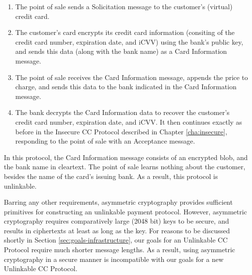 \begin{enumerate}
    \item The point of sale sends a Solicitation message to the customer's (virtual) credit card.
    \item The customer's card encrypts its credit card information (consiting of the credit card number, expiration date, and iCVV) using the bank's public key,
        and sends this data (along with the bank name) as a Card Information message.
    \item The point of sale receives the Card Information message, appends the price to charge, and sends this data to the bank indicated in the Card Information message.
    \item The bank decrypts the Card Information data to recover the customer's credit card number, expiration date, and iCVV.
        It then continues exactly as before in the Insecure CC Protocol described in Chapter \ref{cha:insecure}, responding to the point of sale with an Acceptance message.
\end{enumerate}

In this protocol, the Card Information message consists of an encrypted blob, and the bank name in cleartext.
The point of sale learns nothing about the customer, besides the name of the card's issuing bank.
As a result, this protocol is unlinkable.

Barring any other requirements, asymmetric cryptography provides sufficient primitives for constructing an unlinkable payment protocol.
However, asymmetric cryptography requires comparatively large (2048 bit) keys to be secure, and results in ciphertexts at least as long as the key.
For reasons to be discussed shortly in Section \ref{sec:goals-infrastructure}, our goals for an Unlinkable CC Protocol require much shorter message lengths.
As a result, using asymmetric cryptography in a secure manner is incompatible with our goals for a new Unlinkable CC Protocol.
